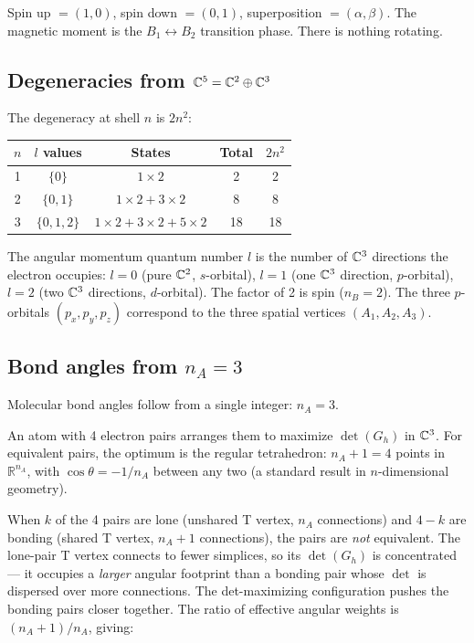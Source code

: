 Spin up $= (1, 0)$, spin down $= (0, 1)$, superposition $= (\alpha, \beta)$. The magnetic moment is the $B_1 \leftrightarrow B_2$ transition phase. There is nothing rotating.

\subsection{Degeneracies from $\mathbb{C}^5 = \mathbb{C}^2 \oplus \mathbb{C}^3$}

The degeneracy at shell $n$ is $2n^2$:
\begin{center}
\begin{tabular}{ccccc}
\hline
$n$ & $l$ values & States & Total & $2n^2$ \\
\hline
1 & $\{0\}$ & $1 \times 2$ & 2 & 2 \\
2 & $\{0, 1\}$ & $1 \times 2 + 3 \times 2$ & 8 & 8 \\
3 & $\{0, 1, 2\}$ & $1 \times 2 + 3 \times 2 + 5 \times 2$ & 18 & 18 \\
\hline
\end{tabular}
\end{center}

The angular momentum quantum number $l$ is the number of $\mathbb{C}^3$ directions the electron occupies: $l = 0$ (pure $\mathbb{C}^2$, $s$-orbital), $l = 1$ (one $\mathbb{C}^3$ direction, $p$-orbital), $l = 2$ (two $\mathbb{C}^3$ directions, $d$-orbital). The factor of 2 is spin ($n_B = 2$). The three $p$-orbitals $(p_x, p_y, p_z)$ correspond to the three spatial vertices $(A_1, A_2, A_3)$.

\subsection{Bond angles from $n_A = 3$}

Molecular bond angles follow from a single integer: $n_A = 3$.

An atom with 4 electron pairs arranges them to maximize $\det(G_h)$ in $\mathbb{C}^3$. For equivalent pairs, the optimum is the regular tetrahedron: $n_A + 1 = 4$ points in $\mathbb{R}^{n_A}$, with $\cos\theta = -1/n_A$ between any two (a standard result in $n$-dimensional geometry).

When $k$ of the 4 pairs are lone (unshared T vertex, $n_A$ connections) and $4-k$ are bonding (shared T vertex, $n_A + 1$ connections), the pairs are \emph{not} equivalent. The lone-pair T vertex connects to fewer simplices, so its $\det(G_h)$ is concentrated --- it occupies a \emph{larger} angular footprint than a bonding pair whose $\det$ is dispersed over more connections. The det-maximizing configuration pushes the bonding pairs closer together. The ratio of effective angular weights is $(n_A + 1)/n_A$, giving:

